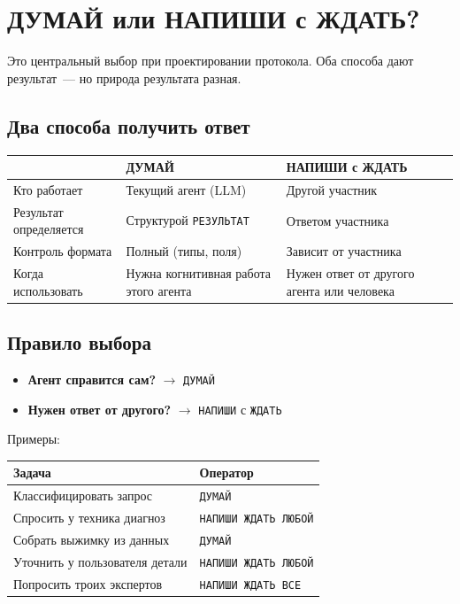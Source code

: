 \documentclass[11pt,a4paper]{article}
\newcommand{\ic}[1]{\texttt{\small #1}}
\begin{document}

\section{ДУМАЙ или НАПИШИ с ЖДАТЬ?}

Это центральный выбор при проектировании протокола. Оба способа дают результат~--- но природа результата разная.

\subsection{Два способа получить ответ}

\begin{center}
\begin{tabular}{@{} l p{5.5cm} p{5.5cm} @{}}
\toprule
& \textbf{ДУМАЙ} & \textbf{НАПИШИ с ЖДАТЬ} \\
\midrule
Кто работает & Текущий агент (LLM) & Другой участник \\
Результат определяется & Структурой \ic{РЕЗУЛЬТАТ} & Ответом участника \\
Контроль формата & Полный (типы, поля) & Зависит от участника \\
Когда использовать & Нужна когнитивная работа этого агента & Нужен ответ от другого агента или человека \\
\bottomrule
\end{tabular}
\end{center}

\subsection{Правило выбора}

\begin{itemize}[leftmargin=2em]
\item \textbf{Агент справится сам?} $\rightarrow$ \ic{ДУМАЙ}
\item \textbf{Нужен ответ от другого?} $\rightarrow$ \ic{НАПИШИ} с \ic{ЖДАТЬ}
\end{itemize}

Примеры:

\begin{center}
\begin{tabular}{@{} p{7cm} l @{}}
\toprule
Задача & Оператор \\
\midrule
Классифицировать запрос & \ic{ДУМАЙ} \\
Спросить у техника диагноз & \ic{НАПИШИ ЖДАТЬ ЛЮБОЙ} \\
Собрать выжимку из данных & \ic{ДУМАЙ} \\
Уточнить у пользователя детали & \ic{НАПИШИ ЖДАТЬ ЛЮБОЙ} \\
Попросить троих экспертов & \ic{НАПИШИ ЖДАТЬ ВСЕ} \\
\bottomrule
\end{tabular}
\end{center}
\end{document}
